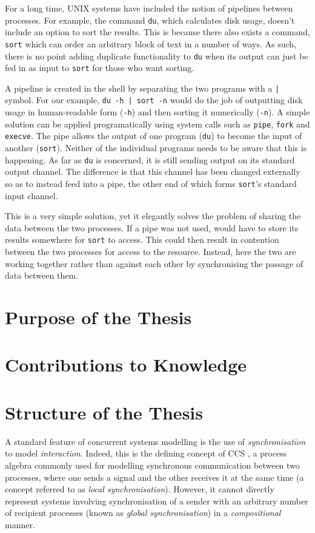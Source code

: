 For a long time, UNIX systems have included the notion of pipelines
between processes.  For example, the command \texttt{du}, which
calculates disk usage, doesn't include an option to sort the results.
This is because there also exists a command, \texttt{sort} which can
order an arbitrary block of text in a number of ways.  As such, there
is no point adding duplicate functionality to \texttt{du} when its
output can just be fed in as input to \texttt{sort} for those who want
sorting.

A pipeline is created in the shell by separating the two programs with
a \texttt{|} symbol.  For our example, \texttt{du -h | sort -n} would
do the job of outputting disk usage in human-readable form
(\texttt{-h}) and then sorting it numerically (\texttt{-n}).  A simple
solution can be applied programatically using system calls such as
\texttt{pipe}, \texttt{fork} and \texttt{execve}.  The pipe allows the
output of one program (\texttt{du}) to become the input of another
(\texttt{sort}).  Neither of the individual programs needs to be aware
that this is happening.  As far as \texttt{du} is concerned, it is
still sending output on its standard output channel.  The difference
is that this channel has been changed externally so as to instead feed
into a pipe, the other end of which forms \texttt{sort}'s standard
input channel.

This is a very simple solution, yet it elegantly solves the problem of
sharing the data between the two processes.  If a pipe was not used,
 would have to store its results somewhere for \texttt{sort}
to access.  This could then result in contention between the two
processes for access to the resource.  Instead, here the two are
working together rather than against each other by synchronising the
passage of data between them.

\section{Purpose of the Thesis}

\section{Contributions to Knowledge}

\section{Structure of the Thesis}

A standard feature of concurrent systems modelling is the use of
\emph{synchronisation} to model \emph{interaction}. Indeed, this is the
defining concept of CCS \cite{milner:ccs}, a process algebra commonly
used for modelling synchronous communication between two processes,
where one sends a signal and the other receives it at the same time (a
concept referred to as \emph{local synchronisation}).  However, it
cannot directly represent systems involving synchronisation of a sender
with an arbitrary number of recipient processes (known as \emph{global
synchronisation}) in a \emph{compositional} manner.  

